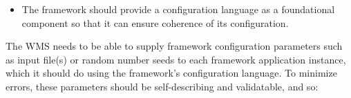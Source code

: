 \documentclass[../main-v1.tex]{subfiles}
\begin{document}
\begin{itemize}
\item The framework should provide a configuration language as a foundational component so that it can ensure coherence of its configuration.
\end{itemize}

The WMS needs to be able to supply framework configuration parameters such as input file(s) or random number seeds to each framework application instance, which it should do using the framework’s configuration language.  To minimize errors, these parameters should be self-describing and validatable, and so:
\end{document}
